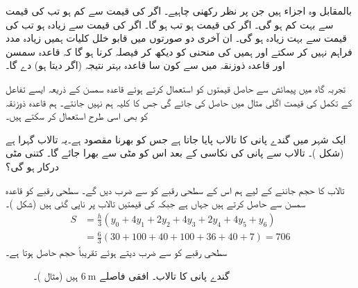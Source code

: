  بالمقابل  وہ اجزاء ہیں جن پر نظر رکھنی چاہیے۔ اگر  کی قیمت  سے کم ہو تب  کی قیمت  سے بہت کم ہو گی۔ اگر  کی قیمت  ہو تب  ہو گا۔ اگر  کی قیمت  سے زیادہ ہو تب  کی قیمت  سے بہت زیادہ ہو گی۔ ان آخری دو صورتوں میں قابو خلل کلیات  ہمیں زیادہ مدد فراہم نہیں کر سکتے  اور ہمیں  کی منحنی کو دیکھ کر فیصلہ کرنا ہو گا کہ  قاعدہ سمسن اور قاعدہ ذوزنقہ میں سے کون سا قاعدہ بہتر نتیجہ (اگر دیتا ہو) دے گا۔

تجربہ گاہ میں پیمائش سے حاصل قیمتوں کو استعمال کرتے ہوئے قاعدہ سمسن کے ذریعہ ایسے تفاعل کے تکمل کی قیمت  اگلی  مثال میں حاصل کی جائے گی جس کا کلیہ ہم  نہیں جانتے۔ ہم قاعدہ ذوزنقہ کو بھی اسی طرح  استعمال کر سکتے ہیں۔

ایک شہر میں گندے پانی کا تالاب پایا جاتا ہے جس کو بھرنا مقصود ہے۔یہ تالاب  گہرا ہے (شکل )۔ تالاب سے پانی کی نکاسی  کے بعد اس کو مٹی سے بھرا جائے گا۔ کتنی مٹی درکار ہو گی؟ 

تالاب کا حجم جاننے کے لیے ہم اس کے سطحی رقبے کو  سے ضرب دیں گے۔ سطحی رقبے  کو قاعدہ سمسن سے حاصل کرتے ہیں جہاں  ہے جبکہ  کی قیمتیں  تالاب پر ناپی گئی ہیں (شکل )۔
\begin{align*}
S&=\frac{h}{3}(y_0+4y_1+2y_2+4y_3+2y_4+4y_5+y_6)\\
&=\frac{6}{3}(30+100+40+100+36+40+7)=706
\end{align*}
سطحی رقبے  کو  سے ضرب دیتے ہوئے تقریباً  حجم حاصل ہوتا ہے۔
\begin{figure}
\centering
{}
\caption{گندے پانی کا تالاب۔ افقی فاصلے $\SI{6}{\meter}$ ہیں (مثال )۔}
\label{شکل_مثال_تکمل_گندے_پانی_کا_تالاب}
\end{figure}

